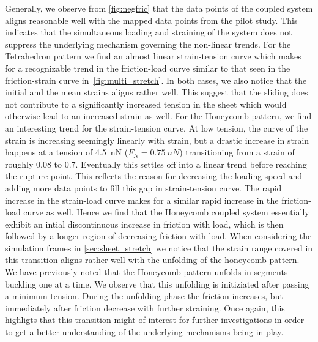 Generally, we observe from \cref{fig:negfric} that the data points of the
coupled system aligns reasonable well with the mapped data points from the pilot
study. This indicates that the simultaneous loading and straining of the system
does not suppress the underlying mechanism governing the non-linear trends. For
the Tetrahedron pattern we find an almost linear strain-tension curve which
makes for a recognizable trend in the friction-load curve similar to that seen
in the friction-strain curve in~\cref{fig:multi_stretch}. In both cases, we
also notice that the initial and the mean strains aligns rather well. This
suggest that the sliding does not contribute to a significantly increased
tension in the sheet which would otherwise lead to an increased strain as well.
For the Honeycomb pattern, we find an interesting trend for the strain-tension
curve. At low tension, the curve of the strain is increasing seemingly linearly
with strain, but a drastic increase in strain happens at a tension of \SI{4.5}{nN} ($F_N = \SI{0.75}{nN}$) transitioning from a strain of roughly 0.08 to 0.7. Eventually
this settles off into a linear trend before reaching the rupture point. This
reflects the reason for decreasing the loading speed and adding more data points
to fill this gap in strain-tension curve. The rapid increase in the strain-load
curve makes for a similar rapid increase in the friction-load curve as well.
Hence we find that the Honeycomb coupled system essentially exhibit an intial discontinuous increase in friction with load, which is then followed by a longer region of  decreasing friction with load. When considering the simulation frames in
\cref{sec:sheet_stretch} we notice that the strain range covered in this transition aligns rather well with the unfolding of the honeycomb pattern. We
have previously noted that the Honeycomb pattern unfolds in segments buckling
one at a time. We observe that this unfolding is initiziated after passing a minimum tension. During the unfolding phase the friction increases, but immediately after friction decrease with further straining. Once again, this highligts that this transition might of interest for further investigations in order to get a better understanding of the underlying mechanisms being in play.

